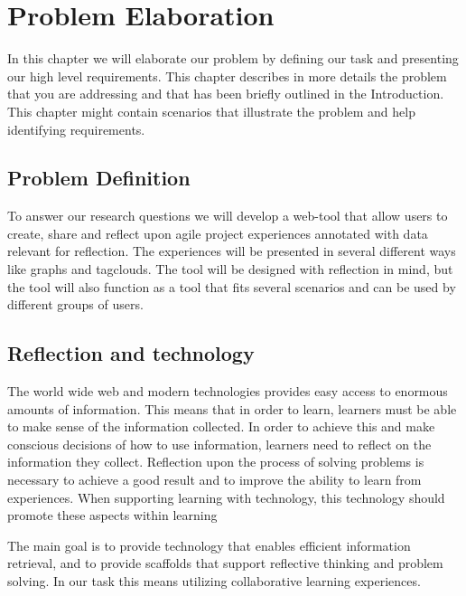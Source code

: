 \chapter{Problem Elaboration}
\label{problemelaboration}
In this chapter we will elaborate our problem by defining our task and presenting our high level requirements.
This chapter describes in more details the problem that you are addressing and that
has been briefly outlined in the Introduction. This chapter might contain scenarios that
illustrate the problem and help identifying requirements.

\section{Problem Definition}
\label{problemdefinition}

To answer our research questions we will develop a web-tool that allow users to create, share and reflect upon agile project experiences annotated with data relevant for reflection. 
The experiences will be presented in several different ways like graphs and tagclouds. The tool will be designed with reflection in mind, but the tool will also function as 
a tool that fits several scenarios and can be used by different groups of users. 

\section{Reflection and technology}
The world wide web and modern technologies provides easy access to enormous amounts of information. This means that in order to learn, learners must be able to make sense of the information collected.  
In order to achieve this and make conscious decisions of how to use information, learners need to reflect on the information they collect. Reflection upon the process of solving problems is necessary to achieve a good result and to improve the ability to learn from experiences. When supporting learning with technology, this technology should promote these aspects within learning\cite{Lin1999}

The main goal is to provide technology that enables efficient information retrieval, and to provide scaffolds that support reflective thinking and problem solving. In our task this means utilizing collaborative learning experiences. 

